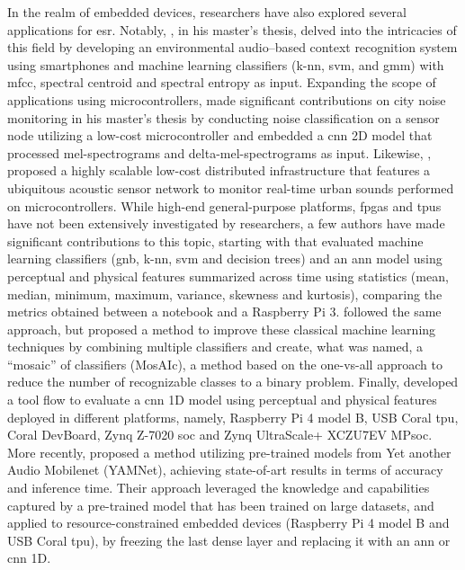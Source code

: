 In the realm of embedded devices, researchers have also explored several applications for \gls{esr}. Notably, \textcite{Abreha2014}, in his master's thesis, delved into the intricacies of this field by developing an environmental audio–based context recognition system using smartphones and machine learning classifiers (\gls{k-nn}, \gls{svm}, and \gls{gmm}) with \gls{mfcc}, spectral centroid and spectral entropy as input. Expanding the scope of applications using microcontrollers, \textcite{Nordby2019} made significant contributions on city noise monitoring in his master’s thesis by conducting noise classification on a sensor node utilizing a low-cost microcontroller and embedded a \gls{cnn} 2D model that processed mel-spectrograms and delta-mel-spectrograms as input. Likewise, \textcite{VidaaVila2020}, proposed a highly scalable low-cost distributed infrastructure that features a ubiquitous acoustic sensor network to monitor real-time urban sounds performed on microcontrollers. While high-end general-purpose platforms, \gls{fpga}s and \gls{tpu}s have not been extensively investigated by researchers, a few authors have made significant contributions to this topic, starting with \textcite{Silva2019} that evaluated machine learning classifiers (\gls{gnb}, \gls{k-nn}, \gls{svm} and decision trees) and an \gls{ann} model using perceptual and physical features summarized across time using statistics (mean, median, minimum, maximum, variance, skewness and kurtosis), comparing the metrics obtained between a notebook and a Raspberry Pi 3. \textcite{Lhoest2021} followed the same approach, but proposed a method to improve these classical machine learning techniques by combining multiple classifiers and create, what was named, a “mosaic” of classifiers (MosAIc), a method based on the one-vs-all approach to reduce the number of recognizable classes to a binary problem. Finally, \textcite{Vandendriessche2021} developed a tool flow to evaluate a \gls{cnn} 1D model using perceptual and physical features deployed in different platforms, namely, Raspberry Pi 4 model B, USB Coral \gls{tpu}, Coral DevBoard, Zynq Z-7020 \gls{soc} and Zynq UltraScale+ XCZU7EV MP\gls{soc}. More recently, \textcite{Lamrini2023} proposed a method utilizing pre-trained models from Yet another Audio Mobilenet (YAMNet), achieving state-of-art results in terms of accuracy and inference time. Their approach leveraged the knowledge and capabilities captured by a pre-trained model that has been trained on large datasets, and applied to resource-constrained embedded devices (Raspberry Pi 4 model B and USB Coral \gls{tpu}), by freezing the last dense layer and replacing it with an \gls{ann} or \gls{cnn} 1D. 

